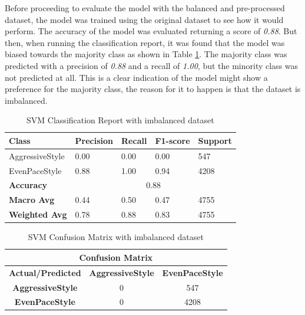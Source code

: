 \documentclass[10pt,journal,compsoc]{IEEEtran}
\begin{document}
Before proceeding to evaluate the model with the balanced and pre-processed dataset, the model was trained using the original dataset to see how it would perform. The accuracy of the model
was evaluated returning a score of \textit{0.88}. But then, when running the classification report, it was found that the model was biased towards the majority class as shown in 
Table \ref{table:svm_classification_report}.
The majority class was predicted with a precision of \textit{0.88} and a recall of \textit{1.00}, but the minority class was not predicted at all. This is a clear indication of 
the model might show a preference for the majority class, the reason for it to happen is that the dataset is imbalanced.

\begin{table}[h]
    \centering
    \begin{tabular}{|l|l|l|l|l|}
    \hline
    \textbf{Class} & \textbf{Precision} & \textbf{Recall} & \textbf{F1-score} & \textbf{Support} \\ \hline
    AggressiveStyle & 0.00 & 0.00 & 0.00 & 547 \\ \hline
    EvenPaceStyle & 0.88 & 1.00 & 0.94 & 4208 \\ \hline
    \textbf{Accuracy} & \multicolumn{4}{c|}{0.88} \\ \hline
    \textbf{Macro Avg} & 0.44 & 0.50 & 0.47 & 4755 \\ \hline
    \textbf{Weighted Avg} & 0.78 & 0.88 & 0.83 & 4755 \\ \hline
    \end{tabular}
    \caption{SVM Classification Report with imbalanced dataset}
    \label{table:svm_classification_report}
\end{table}

\begin{table}[h]
    \centering
    \begin{tabular}{|c|c|c|}
    \hline
    \multicolumn{3}{|c|}{\textbf{Confusion Matrix}} \\
    \hline
    \textbf{Actual/Predicted} & \textbf{AggressiveStyle} & \textbf{EvenPaceStyle} \\ \hline
    \textbf{AggressiveStyle} & 0 & 547 \\ \hline
    \textbf{EvenPaceStyle} & 0 & 4208 \\ \hline
    \end{tabular}
    \caption{SVM Confusion Matrix with imbalanced dataset}
    \label{table:confusion_matrix}
\end{table}
\end{document}
